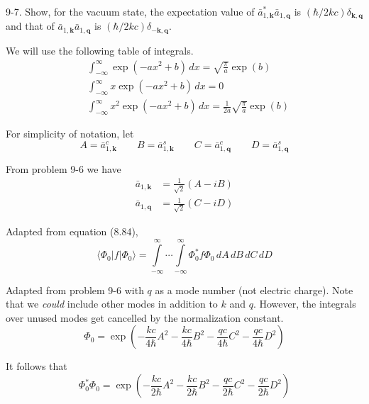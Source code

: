 \documentclass[12pt]{article}
\begin{document}
9-7.
Show, for the vacuum state, the expectation value
of $\bar a_{1,\mathbf k}^*\bar a_{1,\mathbf q}$
is $(\hbar/2kc)\delta_{\mathbf k,\mathbf q}$ and that
of $\bar a_{1,\mathbf k}\bar a_{1,\mathbf q}$
is $(\hbar/2kc)\delta_{-\mathbf k,\mathbf q}$.

\bigskip
We will use the following table of integrals.
\begin{align*}
&\int_{-\infty}^\infty\exp(-ax^2+b)\,dx=\sqrt{\frac{\pi}{a}}\exp(b)
\tag{1}
\\
&\int_{-\infty}^\infty x\exp(-ax^2+b)\,dx=0
\tag{2}
\\
&\int_{-\infty}^\infty x^2\exp(-ax^2+b)\,dx=\frac{1}{2a}\sqrt{\frac{\pi}{a}}\exp(b)
\tag{3}
\end{align*}

For simplicity of notation, let
\begin{equation*}
A=\bar a_{1,\mathbf k}^c
\qquad
B=\bar a_{1,\mathbf k}^s
\qquad
C=\bar a_{1,\mathbf q}^c
\qquad
D=\bar a_{1,\mathbf q}^s
\end{equation*}

From problem 9-6 we have
\begin{equation*}
\begin{aligned}
\bar a_{1,\mathbf k}&=\frac{1}{\sqrt2}(A-iB)
\\
\bar a_{1,\mathbf q}&=\frac{1}{\sqrt2}(C-iD)
\end{aligned}
\tag{4}
\end{equation*}

Adapted from equation (8.84),
\begin{equation*}
\langle\Phi_0|f|\Phi_0\rangle
=\int\limits_{-\infty}^\infty\cdots\int\limits_{-\infty}^\infty
\Phi_0^*f\Phi_0
\,dA\,dB\,dC\,dD
\end{equation*}

Adapted from problem 9-6 with $q$ as a mode number (not electric charge).
Note that we {\it could} include other modes in addition to $k$ and $q$.
However, the integrals over unused modes get
cancelled by the normalization constant.
\begin{equation*}
\Phi_0=\exp\left(
-\frac{kc}{4\hbar}A^2
-\frac{kc}{4\hbar}B^2
-\frac{qc}{4\hbar}C^2
-\frac{qc}{4\hbar}D^2
\right)
\end{equation*}

It follows that
\begin{equation*}
\Phi_0^*\Phi_0=\exp\left(
-\frac{kc}{2\hbar}A^2
-\frac{kc}{2\hbar}B^2
-\frac{qc}{2\hbar}C^2
-\frac{qc}{2\hbar}D^2
\right)
\end{equation*}
\end{document}

